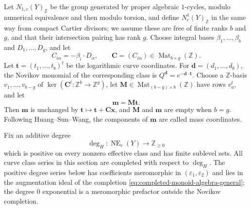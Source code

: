 \documentclass{amsart}
\theoremstyle{definition}
\numberwithin{equation}{section}
\newcommand{\Z}{\mathbb Z}
\newcommand{\eps}{\varepsilon}
\begin{document}
Let \(N_{1,c}(Y)_{\Z}\) be the group generated by proper algebraic \(1\)-cycles, modulo numerical equivalence and then modulo torsion, and define \(N^1_c(Y)_{\Z}\) in the same way from compact Cartier divisors; we assume these are free of finite ranks \(b\) and \(g\), and that their intersection pairing has rank \(g\).  Choose integral bases \(\beta_1,\ldots,\beta_b\) and \(D_1,\ldots,D_g\), and let
\begin{equation}
 C_{i\alpha}=-\beta_i\cdot D_\alpha,\qquad
 \mathbf C=(C_{i\alpha})\in\operatorname{Mat}_{b\times g}(\Z).
\label{eq:general-C-matrix}
\end{equation}
Let \(\mathbf t=(t_1,\ldots,t_b)^t\) be the logarithmic curve coordinates.  For \(\mathbf d=(d_1,\ldots,d_b)\), the Novikov monomial of the corresponding class is \(Q^{\mathbf d}=e^{-\mathbf d\cdot\mathbf t}\).  Choose a \(\Z\)-basis \(v_1,\ldots,v_{b-g}\) of \(\ker(\mathbf C^t:\Z^b\to\Z^g)\), let \(\mathbf M\in\operatorname{Mat}_{(b-g)\times b}(\Z)\) have rows \(v_a^t\), and let
\begin{equation}
 \mathbf m=\mathbf M\mathbf t.
 \label{eq:general-mass-coordinates}
\end{equation}
Then \(\mathbf m\) is unchanged by \(\mathbf t\mapsto\mathbf t+\mathbf C\mathbf x\), and \(\mathbf M\) and \(\mathbf m\) are empty when \(b=g\).  Following Huang--Sun--Wang, the components of \(\mathbf m\) are called mass coordinates.

Fix an additive degree
\begin{equation}
 \deg_H:\operatorname{NE}_c(Y)\longrightarrow\Z_{\geq0}
 \label{eq:general-degree-filtration}
\end{equation}
which is positive on every nonzero effective class and has finite sublevel sets.  All curve class series in this section are completed with respect to \(\deg_H\).  The positive degree series below has coefficients meromorphic in \((\eps_1,\eps_2)\) and lies in the augmentation ideal of the completion \eqref{eq:completed-monoid-algebra-general}; the degree \(0\) exponential is a meromorphic prefactor outside the Novikov completion.
\end{document}
